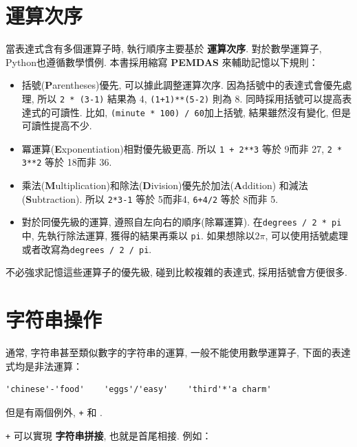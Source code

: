 \documentclass[10pt]{book}
\begin{document}
\section{運算次序}

當表達式含有多個運算子時, 執行順序主要基於 {\bf 運算次序}. 
對於數學運算子, Python也遵循數學慣例. 
本書採用縮寫 {\bf PEMDAS} 來輔助記憶以下規則：

\begin{itemize}

\item 括號({\bf P}arentheses)優先, 可以據此調整運算次序. 
因為括號中的表達式會優先處理, 所以 {\tt 2 * (3-1)} 結果為 4, {\tt (1+1)**(5-2)} 則為 8. 
同時採用括號可以提高表達式的可讀性. 
比如,  {\tt (minute * 100) / 60}加上括號, 結果雖然沒有變化, 但是可讀性提高不少. 

\item 冪運算({\bf E}xponentiation)相對優先級更高. 所以
{\tt 1 + 2**3} 等於 9而非 27,  {\tt 2 * 3**2} 等於 18而非 36. 

\item 乘法({\bf M}ultiplication)和除法({\bf D}ivision)優先於加法({\bf A}ddition)
和減法({\bf S}ubtraction). 所以 {\tt 2*3-1} 等於 5而非4, {\tt 6+4/2} 等於 8而非 5. 

\item 對於同優先級的運算, 遵照自左向右的順序(除冪運算). 
 在{\tt degrees / 2 * pi}中, 先執行除法運算, 獲得的結果再乘以 {\tt pi}. 
如果想除以$2 \pi$,  可以使用括號處理或者改寫為{\tt degrees / 2 / pi}. 

\end{itemize}

不必強求記憶這些運算子的優先級, 碰到比較複雜的表達式, 採用括號會方便很多. 


\section{字符串操作}

通常, 字符串甚至類似數字的字符串的運算, 一般不能使用數學運算子, 
下面的表達式均是非法運算：

\begin{verbatim}
'chinese'-'food'    'eggs'/'easy'    'third'*'a charm'
\end{verbatim}
%

但是有兩個例外,  {\tt +} 和 {\tt *}. 

 {\tt +} 可以實現 {\bf 字符串拼接}, 也就是首尾相接. 例如：
\end{document}
